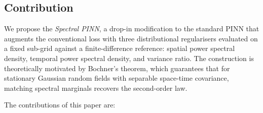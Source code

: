 \documentclass[review,12pt]{elsarticle}
\begin{document}
\subsection{Contribution}
\label{subsec:contribution}

We propose the \emph{Spectral PINN}, a drop-in modification to the
standard PINN that augments the conventional loss with three
distributional regularisers evaluated on a fixed sub-grid against a
finite-difference reference: spatial power spectral density, temporal
power spectral density, and variance ratio. The construction is
theoretically motivated by Bochner's theorem, which guarantees that
for stationary Gaussian random fields with separable space-time
covariance, matching spectral marginals recovers the second-order
law.

The contributions of this paper are:
\end{document}
